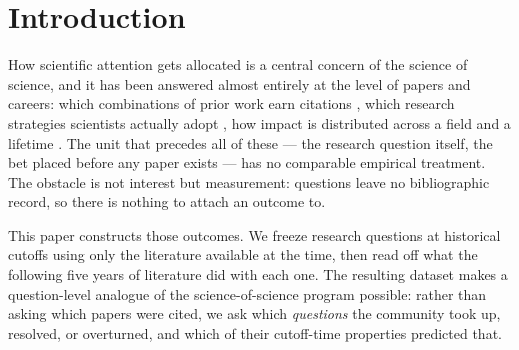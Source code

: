 \documentclass[11pt]{article}
\begin{document}
\begin{abstract}
predicts uptake ($\beta=+0.45$/SD), explicit contradiction predicts
engagement, and quantified, cutoff-persistent tensions carry every
resolution and premise refutation --- a learnable, mining-time prior
for structure-first question generation. Finally, a complete replication
of the protocol in a maximally distant second domain --- anti-aging
skincare-ingredient research (19{,}193 PubMed abstracts, 1{,}043
backtested questions, a deterministic template generator and a
checkable-condition judge) --- reproduces the predictability (AUC
0.75--0.84), the control ordering, the breadth effect, the hypothesis
failures, and the reliability ceiling ($\kappa=0.22$ vs.\ 0.21), while
the sign of specificity reverses exactly as the engagement-cost account
predicts. All data, code, labels, and
judge rationales for both domains are released.
\end{abstract}

\section{Introduction}

How scientific attention gets allocated is a central concern of the science
of science, and it has been answered almost entirely at the level of papers
and careers: which combinations of prior work earn citations
\cite{uzzi2013}, which research strategies scientists actually adopt
\cite{foster2015}, how impact is distributed across a field and a lifetime
\cite{fortunato2018,wang2021}. The unit that precedes all of these --- the
research question itself, the bet placed before any paper exists --- has no
comparable empirical treatment. The obstacle is not interest but
measurement: questions leave no bibliographic record, so there is nothing to
attach an outcome to.

This paper constructs those outcomes. We freeze research questions at
historical cutoffs using only the literature available at the time, then
read off what the following five years of literature did with each one. The
resulting dataset makes a question-level analogue of the science-of-science
program possible: rather than asking which papers were cited, we ask which
\emph{questions} the community took up, resolved, or overturned, and which
of their cutoff-time properties predicted that.
\end{document}
